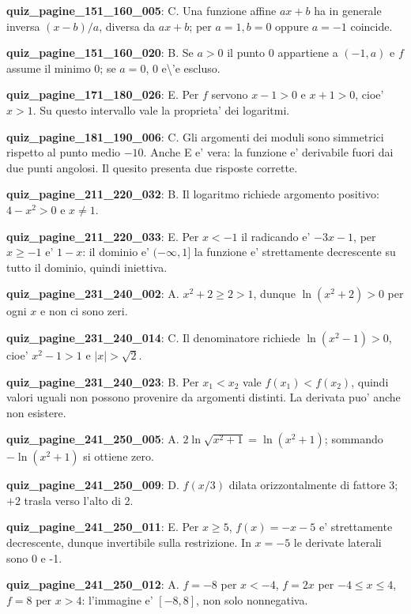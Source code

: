 \documentclass[11pt,a4paper]{article}
\newcounter{quiz}
\begin{document}
\noindent\textbf{quiz\_pagine\_151\_160\_005}: C. Una funzione affine $ax+b$ ha in generale inversa $(x-b)/a$, diversa da $ax+b$; per $a=1,b=0$ oppure $a=-1$ coincide.\par\medskip
\noindent\textbf{quiz\_pagine\_151\_160\_020}: B. Se $a>0$ il punto $0$ appartiene a $(-1,a)$ e $f$ assume il minimo $0$; se $a=0$, $0$ e\textbackslash{}'e escluso.\par\medskip
\noindent\textbf{quiz\_pagine\_171\_180\_026}: E. Per $f$ servono $x-1>0$ e $x+1>0$, cioe' $x>1$. Su questo intervallo vale la proprieta' dei logaritmi.\par\medskip
\noindent\textbf{quiz\_pagine\_181\_190\_006}: C. Gli argomenti dei moduli sono simmetrici rispetto al punto medio $-10$. Anche E e' vera: la funzione e' derivabile fuori dai due punti angolosi. Il quesito presenta due risposte corrette.\par\medskip
\noindent\textbf{quiz\_pagine\_211\_220\_032}: B. Il logaritmo richiede argomento positivo: $4-x^2>0$ e $x\neq1$.\par\medskip
\noindent\textbf{quiz\_pagine\_211\_220\_033}: E. Per $x<-1$ il radicando e' $-3x-1$, per $x\geq-1$ e' $1-x$: il dominio e' $(-\infty,1]$ la funzione e' strettamente decrescente su tutto il dominio, quindi iniettiva.\par\medskip
\noindent\textbf{quiz\_pagine\_231\_240\_002}: A. $x^2+2\geq2>1$, dunque $\ln(x^2+2)>0$ per ogni $x$ e non ci sono zeri.\par\medskip
\noindent\textbf{quiz\_pagine\_231\_240\_014}: C. Il denominatore richiede $\ln(x^2-1)>0$, cioe' $x^2-1>1$ e $|x|>\sqrt2$.\par\medskip
\noindent\textbf{quiz\_pagine\_231\_240\_023}: B. Per $x_1<x_2$ vale $f(x_1)<f(x_2)$, quindi valori uguali non possono provenire da argomenti distinti. La derivata puo' anche non esistere.\par\medskip
\noindent\textbf{quiz\_pagine\_241\_250\_005}: A. $2\ln\sqrt{x^2+1}=\ln(x^2+1)$; sommando $-\ln(x^2+1)$ si ottiene zero.\par\medskip
\noindent\textbf{quiz\_pagine\_241\_250\_009}: D. $f(x/3)$ dilata orizzontalmente di fattore 3; $+2$ trasla verso l'alto di 2.\par\medskip
\noindent\textbf{quiz\_pagine\_241\_250\_011}: E. Per $x\geq5$, $f(x)=-x-5$ e' strettamente decrescente, dunque invertibile sulla restrizione. In $x=-5$ le derivate laterali sono 0 e -1.\par\medskip
\noindent\textbf{quiz\_pagine\_241\_250\_012}: A. $f=-8$ per $x<-4$, $f=2x$ per $-4\leq x\leq4$, $f=8$ per $x>4$: l'immagine e' $[-8,8]$, non solo nonnegativa.\par\medskip
\end{document}
